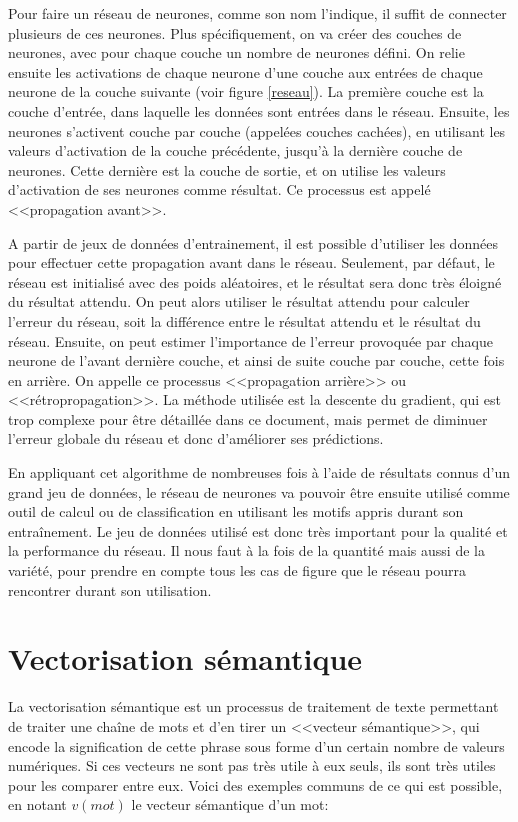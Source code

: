 \documentclass[openany, 11pt]{memoir}
\begin{document}
\bigskip
Pour faire un réseau de neurones, comme son nom l'indique, il suffit de connecter plusieurs de ces neurones. Plus spécifiquement, on va créer des couches de neurones, avec pour chaque couche un nombre de neurones défini. On relie ensuite les activations de chaque neurone d'une couche aux entrées de chaque neurone de la couche suivante (voir figure \ref{reseau}). La première couche est la couche d'entrée, dans laquelle les données sont entrées dans le réseau. Ensuite, les neurones s'activent couche par couche (appelées couches cachées), en utilisant les valeurs d'activation de la couche précédente, jusqu'à la dernière couche de neurones. Cette dernière est la couche de sortie, et on utilise les valeurs d'activation de ses neurones comme résultat. Ce processus est appelé <<propagation avant>>.

\bigskip
A partir de jeux de données d'entrainement, il est possible d'utiliser les données pour effectuer cette propagation avant dans le réseau. Seulement, par défaut, le réseau est initialisé avec des poids aléatoires, et le résultat sera donc très éloigné du résultat attendu. On peut alors utiliser le résultat attendu pour calculer l'erreur du réseau, soit la différence entre le résultat attendu et le résultat du réseau. Ensuite, on peut estimer l'importance de l'erreur provoquée par chaque neurone de l'avant dernière couche, et ainsi de suite couche par couche, cette fois en arrière. On appelle ce processus <<propagation arrière>> ou <<rétropropagation>>. La méthode utilisée est la descente du gradient, qui est trop complexe pour être détaillée dans ce document, mais permet de diminuer l'erreur globale du réseau et donc d'améliorer ses prédictions.

En appliquant cet algorithme de nombreuses fois à l'aide de résultats connus d'un grand jeu de données, le réseau de neurones va pouvoir être ensuite utilisé comme outil de calcul ou de classification en utilisant les motifs appris durant son entraînement. Le jeu de données utilisé est donc très important pour la qualité et la performance du réseau. Il nous faut à la fois de la quantité mais aussi de la variété, pour prendre en compte tous les cas de figure que le réseau pourra rencontrer durant son utilisation.

\section{Vectorisation sémantique}
\label{vectorisationsemantique}

La vectorisation sémantique est un processus de traitement de texte permettant de traiter une chaîne de mots et d'en tirer un <<vecteur sémantique>>, qui encode la signification de cette phrase sous forme d'un certain nombre de valeurs numériques. Si ces vecteurs ne sont pas très utile à eux seuls, ils sont très utiles pour les comparer entre eux. Voici des exemples communs de ce qui est possible, en notant $v(mot)$ le vecteur sémantique d'un mot:
\end{document}
